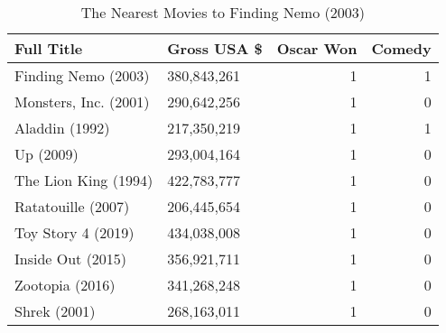 \begin{table}[H]
\centering
\begin{tabular}{llrr}
  \hline
Full Title & Gross USA \$ & Oscar Won & Comedy \\ 
  \hline
Finding Nemo (2003) & 380,843,261 &   1 &   1 \\ 
  Monsters, Inc. (2001) & 290,642,256 &   1 &   0 \\ 
  Aladdin (1992) & 217,350,219 &   1 &   1 \\ 
  Up (2009) & 293,004,164 &   1 &   0 \\ 
  The Lion King (1994) & 422,783,777 &   1 &   0 \\ 
  Ratatouille (2007) & 206,445,654 &   1 &   0 \\ 
  Toy Story 4 (2019) & 434,038,008 &   1 &   0 \\ 
  Inside Out (2015) & 356,921,711 &   1 &   0 \\ 
  Zootopia (2016) & 341,268,248 &   1 &   0 \\ 
  Shrek (2001) & 268,163,011 &   1 &   0 \\ 
   \hline
\end{tabular}
\caption{The Nearest Movies to Finding Nemo (2003)} 
\end{table}

